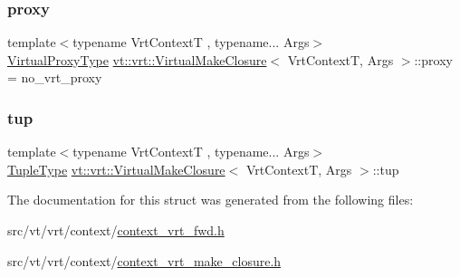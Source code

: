 \subsubsection{\texorpdfstring{proxy}{proxy}}
{\footnotesize\ttfamily template$<$typename Vrt\+ContextT , typename... Args$>$ \\
\hyperlink{namespacevt_a1b417dd5d684f045bb58a0ede70045ac}{Virtual\+Proxy\+Type} \hyperlink{structvt_1_1vrt_1_1_virtual_make_closure}{vt\+::vrt\+::\+Virtual\+Make\+Closure}$<$ Vrt\+ContextT, Args $>$\+::proxy = no\+\_\+vrt\+\_\+proxy}

\mbox{\label{structvt_1_1vrt_1_1_virtual_make_closure_abdf06c446440f2a8db8a878cd9b49787}} 
\subsubsection{\texorpdfstring{tup}{tup}}
{\footnotesize\ttfamily template$<$typename Vrt\+ContextT , typename... Args$>$ \\
\hyperlink{structvt_1_1vrt_1_1_virtual_make_closure_a19b5a051873fa150d9e8ef778fa8afb2}{Tuple\+Type} \hyperlink{structvt_1_1vrt_1_1_virtual_make_closure}{vt\+::vrt\+::\+Virtual\+Make\+Closure}$<$ Vrt\+ContextT, Args $>$\+::tup}



The documentation for this struct was generated from the following files\+:\begin{DoxyCompactItemize}
\item 
src/vt/vrt/context/\hyperlink{context__vrt__fwd_8h}{context\+\_\+vrt\+\_\+fwd.\+h}\item 
src/vt/vrt/context/\hyperlink{context__vrt__make__closure_8h}{context\+\_\+vrt\+\_\+make\+\_\+closure.\+h}\end{DoxyCompactItemize}

